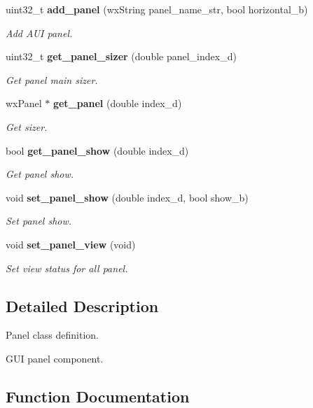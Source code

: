 \begin{DoxyCompactItemize}
uint32\+\_\+t \textbf{ add\+\_\+panel} (wx\+String panel\+\_\+name\+\_\+str, bool horizontal\+\_\+b)
\begin{DoxyCompactList}\small\item\em Add A\+UI panel. \end{DoxyCompactList}\item 
uint32\+\_\+t \textbf{ get\+\_\+panel\+\_\+sizer} (double panel\+\_\+index\+\_\+d)
\begin{DoxyCompactList}\small\item\em Get panel main sizer. \end{DoxyCompactList}\item 
wx\+Panel $\ast$ \textbf{ get\+\_\+panel} (double index\+\_\+d)
\begin{DoxyCompactList}\small\item\em Get sizer. \end{DoxyCompactList}\item 
bool \textbf{ get\+\_\+panel\+\_\+show} (double index\+\_\+d)
\begin{DoxyCompactList}\small\item\em Get panel show. \end{DoxyCompactList}\item 
void \textbf{ set\+\_\+panel\+\_\+show} (double index\+\_\+d, bool show\+\_\+b)
\begin{DoxyCompactList}\small\item\em Set panel show. \end{DoxyCompactList}\item 
void \textbf{ set\+\_\+panel\+\_\+view} (void)
\begin{DoxyCompactList}\small\item\em Set view status for all panel. \end{DoxyCompactList}\end{DoxyCompactItemize}


\subsection{Detailed Description}
Panel class definition. 

G\+UI panel component.

\subsection{Function Documentation}
\mbox{\label{group___panel_ga490542606fe12f142cd2b00cb1ecaefd}} 

